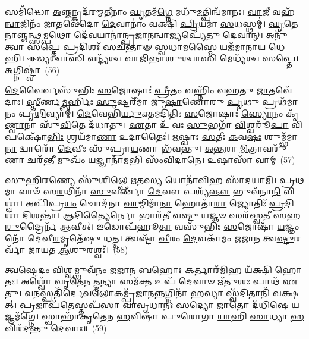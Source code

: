 {\anuvakamend[{𑌰\-\ul{𑌕𑍍𑌷𑌾}\-\-\ul{𑍟}\-𑌸𑍍𑌯𑍗𑌦𑍁᳴𑌮𑍍𑌬𑌰𑍀 𑌆\-\ul{𑌦𑌿}\-𑌤𑍍𑌯 \ul{𑌉}\-𑌦𑍍𑌯\-\ul{𑌤𑍍𑌯} 𑌸़𑌞𑍍𑌚𑌤𑍁᳴𑌰𑍍𑌵𑌿𑍞𑌶𑌤𑌿𑌶𑍍𑌚}]}%

𑌸𑌮𑌿᳴𑌦𑍍𑌧𑍋 \ul{𑌅}\-𑌞𑍍𑌜𑌨𑍍𑌕𑍃𑌦᳴𑌰𑌮𑍍𑌮\-\ul{𑌤𑍀}\-𑌨𑌾𑌂 \ul{𑌘𑍃}\-𑌤𑌮᳴\-\ul{𑌗𑍍𑌨𑍇} 𑌮𑌧𑍁᳴\-\ul{𑌮}\-𑌤𑍍𑌪𑌿𑌨𑍍𑌵᳴𑌮𑌾𑌨𑌃। \ul{𑌵𑌾}\-𑌜𑍀 𑌵𑌹᳴\-\ul{𑌨𑍍𑌵𑌾}\-𑌜𑌿𑌨𑌂᳴ 𑌜𑌾𑌤𑌵𑍇𑌦𑍋 \ul{𑌦𑍇}\-𑌵𑌾𑌨𑌾𑌂॑ 𑌵𑌕𑍍𑌷𑌿 \ul{𑌪𑍍𑌰𑌿}\-𑌯𑌮𑌾 \ul{𑌸}\-𑌧𑌸𑍍𑌥𑌮𑍍॑। \ul{𑌘𑍃}\-𑌤𑍇\-\ul{𑌨𑌾}\-𑌞𑍍𑌜𑌨𑍍𑌥𑍍𑌸\-\ul{𑌮𑍍𑌪}\-𑌥𑍋 𑌦𑍇᳴\-\ul{𑌵}\-𑌯𑌾𑌨𑌾॑𑌨𑍍𑌪𑍍𑌰\-\ul{𑌜𑌾}\-𑌨\-\ul{𑌨𑍍𑌵𑌾}\-𑌜𑍍𑌯𑌪𑍍𑌯𑍇᳴𑌤𑍁 \ul{𑌦𑍇}\-𑌵𑌾𑌨𑍍। 𑌅𑌨𑍁᳴ 𑌤𑍍𑌵𑌾 𑌸𑌪𑍍𑌤𑍇 \ul{𑌪𑍍𑌰}\-𑌦𑌿𑌶𑌃᳴ 𑌸𑌚𑌨𑍍𑌤𑌾𑍟 \ul{𑌸𑍍𑌵}\-𑌧𑌾\-\ul{𑌮}\-𑌸𑍍𑌮𑍈 𑌯𑌜᳴𑌮𑌾𑌨𑌾𑌯 𑌧𑍇𑌹𑌿। 𑌈\-\ul{𑌡𑍍𑌯}\-𑌶𑍍𑌚𑌾\-\ul{𑌸𑌿} 𑌵𑌨𑍍𑌦𑍍𑌯᳴𑌶𑍍𑌚 𑌵𑌾𑌜𑌿\-\ul{𑌨𑍍𑌨𑌾}\-𑌶𑍁𑌶𑍍𑌚𑌾\-\ul{𑌸𑌿} 𑌮𑍇𑌧𑍍𑌯᳴𑌶𑍍𑌚 𑌸𑌪𑍍𑌤𑍇। \ul{𑌅}\-𑌗𑍍𑌨𑌿𑌷𑍍𑌟𑍍𑌵𑌾॑~(56)

\-\ul{𑌦𑍇}\-𑌵𑍈𑌰𑍍𑌵𑌸𑍁᳴𑌭𑌿𑌃 \ul{𑌸}\-𑌜𑍋𑌷𑌾𑌃॑ \ul{𑌪𑍍𑌰𑍀}\-𑌤𑌂 𑌵𑌹𑍍𑌨𑌿𑌂᳴ 𑌵𑌹𑌤𑍁 \ul{𑌜𑌾}\-𑌤𑌵𑍇᳴𑌦𑌾𑌃। \ul{𑌸𑍍𑌤𑍀}\-𑌰𑍍𑌣\-\ul{𑌮𑍍𑌬}\-𑌰𑍍\mbox{}𑌹𑌿𑌃 \ul{𑌸𑍁}\-𑌷𑍍𑌟𑌰𑍀᳴𑌮𑌾 𑌜𑍁\-\ul{𑌷𑌾}\-𑌣𑍋𑌰𑍁 \ul{𑌪𑍃}\-𑌥𑍁 𑌪𑍍𑌰𑌥᳴𑌮𑌾𑌨𑌂 𑌪𑍃\-\ul{𑌥𑌿}\-𑌵𑍍𑌯𑌾𑌮𑍍। \ul{𑌦𑍇}\-𑌵𑍇𑌭𑌿᳴\-\ul{𑌰𑍍𑌯𑍁}\-𑌕𑍍𑌤𑌮𑌦𑌿᳴𑌤𑌿𑌃 \ul{𑌸}\-𑌜𑍋𑌷𑌾𑌃॑ \ul{𑌸𑍍𑌯𑍋}\-𑌨𑌂 𑌕𑍃᳴\-\ul{𑌣𑍍𑌵𑌾}\-𑌨𑌾 𑌸𑍁᳴\-\ul{𑌵𑌿}\-𑌤𑍇 𑌦᳴𑌧𑌾𑌤𑍁। \ul{𑌏}\-𑌤𑌾 𑌉᳴ 𑌵𑌃 \ul{𑌸𑍁}\-𑌭𑌗𑌾᳴ \ul{𑌵𑌿}\-𑌶𑍍𑌵𑌰𑍂᳴\-\ul{𑌪𑌾} 𑌵𑌿 𑌪𑌕𑍍𑌷𑍋᳴\-\ul{𑌭𑌿𑌃} 𑌶𑍍𑌰𑌯᳴𑌮𑌾\-\ul{𑌣𑌾} 𑌉𑌦𑌾𑌤𑍈𑌃॑। \ul{𑌋}\-𑌷𑍍𑌵𑌾𑌃 \ul{𑌸}\-𑌤𑍀𑌃 \ul{𑌕}\-𑌵\-\ul{𑌷𑌃} 𑌶𑍁𑌮𑍍𑌭᳴𑌮𑌾\-\ul{𑌨𑌾} 𑌦𑍍𑌵𑌾𑌰𑍋᳴ \ul{𑌦𑍇}\-𑌵𑍀𑌃 𑌸𑍁᳴𑌪𑍍𑌰𑌾\-\ul{𑌯}\-𑌣𑌾 𑌭᳴𑌵𑌨𑍍𑌤𑍁। \ul{𑌅}\-\-\ul{𑌨𑍍𑌤}\-𑌰𑌾 \ul{𑌮𑌿}\-𑌤𑍍𑌰𑌾𑌵𑌰𑍁᳴\-\ul{𑌣𑌾} 𑌚𑌰᳴\-\ul{𑌨𑍍𑌤𑍀} 𑌮𑍁𑌖𑌂᳴ \ul{𑌯}\-𑌜𑍍𑌞𑌾𑌨𑌾᳴\-\ul{𑌮}\-𑌭𑌿 𑌸𑌂᳴𑌵𑌿\-\ul{𑌦𑌾}\-𑌨𑍇। \ul{𑌉}\-𑌷𑌾𑌸𑌾᳴ 𑌵𑌾𑌮𑍍~(57)

\-\ul{𑌸𑍁}\-\-\ul{𑌹𑌿}\-\-\ul{𑌰}\-𑌣𑍍𑌯𑍇 𑌸𑍁᳴\-\ul{𑌶𑌿}\-𑌲𑍍𑌪𑍇 \ul{𑌋}\-𑌤\-\ul{𑌸𑍍𑌯} 𑌯𑍋𑌨𑌾᳴\-\ul{𑌵𑌿}\-𑌹 𑌸𑌾᳴𑌦𑌯𑌾𑌮𑌿। \ul{𑌪𑍍𑌰}\-\-\ul{𑌥}\-𑌮𑌾 𑌵𑌾𑍞᳴ 𑌸\-\ul{𑌰}\-𑌥𑌿𑌨𑌾᳴ \ul{𑌸𑍁}\-𑌵𑌰𑍍𑌣𑌾᳴ \ul{𑌦𑍇}\-𑌵𑍗 𑌪𑌶𑍍𑌯᳴\-\ul{𑌨𑍍𑌤𑍗} 𑌭𑍁𑌵᳴𑌨𑌾\-\ul{𑌨𑌿} 𑌵𑌿𑌶𑍍𑌵𑌾॑। 𑌅𑌪𑌿᳴𑌪𑍍𑌰\-\ul{𑌯𑌂} 𑌚𑍋𑌦᳴𑌨𑌾 \ul{𑌵𑌾}\-𑌮𑍍𑌮𑌿𑌮𑌾᳴\-\ul{𑌨𑌾} 𑌹𑍋𑌤𑌾᳴\-\ul{𑌰𑌾} 𑌜𑍍𑌯𑍋𑌤𑌿𑌃᳴ \ul{𑌪𑍍𑌰}\-𑌦𑌿𑌶𑌾᳴ \ul{𑌦𑌿}\-𑌶𑌨𑍍𑌤𑌾॑। \ul{𑌆}\-\-\ul{𑌦𑌿}\-𑌤𑍍𑌯𑍈\-\ul{𑌰𑍍𑌨𑍋} 𑌭𑌾𑌰᳴𑌤𑍀 𑌵𑌷𑍍𑌟𑍁 \ul{𑌯}\-𑌜𑍍𑌞𑍞 𑌸𑌰᳴𑌸𑍍𑌵𑌤𑍀 \ul{𑌸}\-𑌹 \ul{𑌰𑍁}\-𑌦𑍍𑌰𑍈𑌰𑍍𑌨᳴ 𑌆𑌵𑍀𑌤𑍍। 𑌇𑌡𑍋𑌪᳴𑌹𑍂\-\ul{𑌤𑌾} 𑌵𑌸𑍁᳴𑌭𑌿𑌃 \ul{𑌸}\-𑌜𑍋𑌷𑌾᳴ \ul{𑌯}\-𑌜𑍍𑌞𑌂 𑌨𑍋᳴ 𑌦𑍇𑌵𑍀\-\ul{𑌰}\-𑌮𑍃𑌤𑍇᳴𑌷𑍁 𑌧𑌤𑍍𑌤। 𑌤𑍍𑌵𑌷𑍍𑌟𑌾᳴ \ul{𑌵𑍀}\-𑌰𑌂 \ul{𑌦𑍇}\-𑌵𑌕𑌾᳴𑌮𑌂 𑌜𑌜𑌾\-\ul{𑌨} 𑌤𑍍𑌵\-\ul{𑌷𑍍𑌟𑍁}\-𑌰𑌰𑍍𑌵𑌾᳴ 𑌜𑌾𑌯𑌤 \ul{𑌆}\-𑌶𑍁𑌰𑌶𑍍𑌵𑌃᳴।~(58)

𑌤𑍍𑌵\-\ul{𑌷𑍍𑌟𑍇}\-𑌦𑌂 𑌵𑌿\-\ul{𑌶𑍍𑌵}\-𑌮𑍍𑌭𑍁𑌵᳴𑌨𑌂 𑌜𑌜𑌾𑌨 \ul{𑌬}\-𑌹𑍋𑌃 \ul{𑌕}\-𑌰𑍍𑌤𑌾𑌰᳴\-\ul{𑌮𑌿}\-𑌹 𑌯᳴𑌕𑍍𑌷𑌿 𑌹𑍋𑌤𑌃। 𑌅𑌶𑍍𑌵𑍋᳴ \ul{𑌘𑍃}\-𑌤𑍇\-\ul{𑌨} 𑌤𑍍𑌮\-\ul{𑌨𑍍𑌯𑌾} 𑌸𑌮᳴\-\ul{𑌕𑍍𑌤} 𑌉𑌪᳴ \ul{𑌦𑍇}\-𑌵𑌾𑍞 𑌋᳴\-\ul{𑌤𑍁}\-𑌶𑌃 𑌪𑌾𑌥᳴ 𑌏𑌤𑍁। 𑌵\-\ul{𑌨}\-𑌸𑍍𑌪𑌤𑌿᳴𑌰𑍍𑌦𑍇𑌵\-\ul{𑌲𑍋}\-𑌕𑌮𑍍𑌪𑍍𑌰᳴\-\ul{𑌜𑌾}\-𑌨\-\ul{𑌨𑍍𑌨}\-𑌗𑍍𑌨𑌿𑌨𑌾᳴ \ul{𑌹}\-𑌵𑍍𑌯𑌾 𑌸𑍍𑌵᳴\-\ul{𑌦𑌿}\-𑌤𑌾𑌨𑌿᳴ 𑌵𑌕𑍍𑌷𑌤𑍍। \ul{𑌪𑍍𑌰}\-𑌜𑌾𑌪᳴\-\ul{𑌤𑍇}\-𑌸𑍍𑌤𑌪᳴𑌸𑌾 𑌵𑌾𑌵𑍃\-\ul{𑌧𑌾}\-𑌨𑌃 \ul{𑌸}\-𑌦𑍍𑌯𑍋 \ul{𑌜𑌾}\-𑌤𑍋 𑌦᳴𑌧𑌿𑌷𑍇 \ul{𑌯}\-𑌜𑍍𑌞𑌮᳴𑌗𑍍𑌨𑍇। 𑌸𑍍𑌵𑌾𑌹𑌾᳴𑌕𑍃𑌤𑍇𑌨 \ul{𑌹}\-𑌵𑌿𑌷𑌾᳴ 𑌪𑍁𑌰𑍋𑌗𑌾 \ul{𑌯𑌾}\-𑌹𑌿 \ul{𑌸𑌾}\-𑌧𑍍𑌯𑌾 \ul{𑌹}\-𑌵𑌿𑌰᳴𑌦𑌨𑍍𑌤𑍁 \ul{𑌦𑍇}\-𑌵𑌾𑌃॥~(59)

{\anuvakamend[{\-\ul{𑌅}\-𑌗𑍍𑌨𑌿𑌷𑍍𑌟𑍍𑌵𑌾᳴ \ul{𑌵𑌾}\-𑌮\-\ul{𑌶𑍍𑌵𑍋} 𑌦𑍍𑌵𑌿𑌚᳴𑌤𑍍𑌵𑌾𑌰𑌿𑍞𑌶𑌚𑍍𑌚}]}%


{\anuvakamend[{𑌵𑌿𑌷𑍍𑌣𑍁᳴𑌮𑍁\-\ul{𑌖𑌾} 𑌅𑌨𑍍𑌨᳴𑌪\-\ul{𑌤𑍇} 𑌯𑌾𑌵᳴\-\ul{𑌤𑍀} 𑌵𑌿 𑌵𑍈 𑌪𑍁᳴𑌰𑍁𑌷\-\ul{𑌮𑌾}\-𑌤𑍍𑌰𑍇𑌣𑌾\-\ul{𑌗𑍍𑌨𑍇} 𑌤\-\ul{𑌵} 𑌶𑍍𑌰\-\ul{𑌵𑍋} 𑌬𑍍𑌰𑌹𑍍𑌮᳴ 𑌜\-\ul{𑌜𑍍𑌞𑌾}\-𑌨𑍟 𑌸𑍍𑌵᳴𑌯𑌮𑌾\-\ul{𑌤𑍃}\-𑌣𑍍𑌣𑌾\-\ul{𑌮𑍇}\-𑌷𑌾𑌂 𑌵𑍈 \ul{𑌪}\-𑌶𑍁𑌰𑍍𑌗𑌾᳴\-\ul{𑌯}\-𑌤𑍍𑌰𑍀 𑌕\-\ul{𑌸𑍍𑌤𑍍𑌵𑌾} 𑌦𑍍𑌵𑌾𑌦᳴𑌶}]}%
